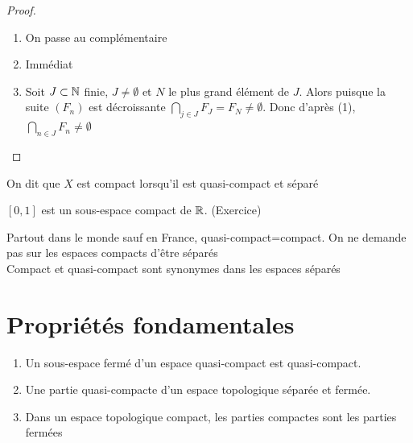 \documentclass[]{report}
\begin{document}
    \begin{proof}
        \begin{enumerate}
            \item On passe au complémentaire
            \item Immédiat
            \item Soit $J\subset \mathbb{N}$ finie, $J\neq \emptyset$ et $N$ le plus grand élément de $J$. Alors puisque la suite $(F_n)$ est décroissante $\bigcap_{j\in J}F_J=F_N\neq \emptyset$. Donc d'après (1), $\bigcap_{n\in J}F_n\neq\emptyset$
        \end{enumerate}
    \end{proof}

    \begin{df}{}{}
        On dit que $X$ est compact lorsqu'il est quasi-compact et séparé
    \end{df}

    \begin{ex}{}{}
        $[0,1]$ est un sous-espace compact de $\mathbb{R}$. (Exercice)
    \end{ex}

    \begin{re}{}{}
        Partout dans le monde sauf en France, quasi-compact=compact. On ne demande pas sur les espaces compacts d'être séparés\\
        Compact et quasi-compact sont synonymes dans les espaces séparés
    \end{re}

    \section{Propriétés fondamentales}

    \begin{prop}{}{}
        \begin{enumerate}
            \item Un sous-espace fermé d'un espace quasi-compact est quasi-compact.
            \item Une partie quasi-compacte d'un espace topologique séparée et fermée.
            \item Dans un espace topologique compact, les parties compactes sont les parties fermées
        \end{enumerate}
    \end{prop}
\end{document}
